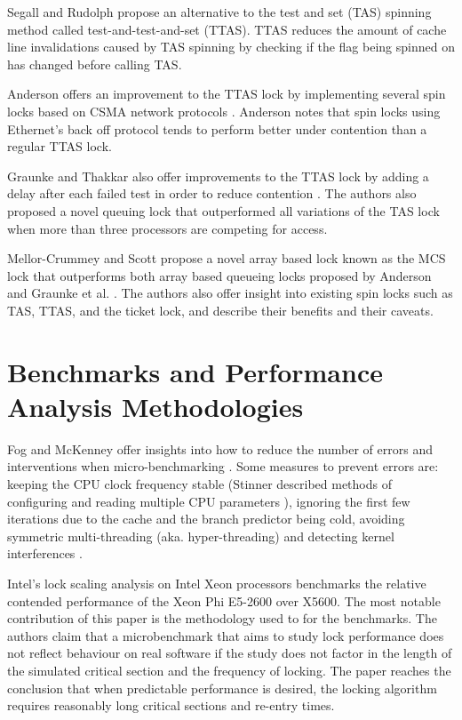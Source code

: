 Segall and Rudolph \cite{rudolph1984dynamic} propose an alternative to the test and set (TAS) spinning method called test-and-test-and-set (TTAS). TTAS reduces the amount of cache line invalidations caused by TAS spinning by checking if the flag being spinned on has changed before calling TAS.

Anderson offers an improvement to the TTAS lock by implementing several spin locks based on CSMA network protocols \cite{anderson1990performance}. Anderson notes that spin locks using Ethernet's back off protocol tends to perform better under contention than a regular TTAS lock.

Graunke and Thakkar also offer improvements to the TTAS lock by adding a delay after each failed test in order to reduce contention \cite{graunke1990synchronization}. The authors also proposed a novel queuing lock that outperformed all variations of the TAS lock when more than three processors are competing for access.

Mellor-Crummey and Scott propose a novel array based lock known as the MCS lock that outperforms both array based queueing locks proposed by Anderson and Graunke et al. \cite{mellor1991algorithms}. The authors also offer insight into existing spin locks such as TAS, TTAS, and the ticket lock, and describe their benefits and their caveats.

\section{Benchmarks and Performance Analysis Methodologies}
Fog and McKenney offer insights into how to reduce the number of errors and interventions when micro-benchmarking \cite{fog1996optimizing,fog2020optimizing, mckenney2017parallel}. Some measures to prevent errors are: keeping the CPU clock frequency stable (Stinner described methods of configuring and reading multiple CPU parameters \cite{stinnerpstate}), ignoring the first few iterations due to the cache and the branch predictor being cold\cite{fog1996optimizing}, avoiding symmetric multi-threading (aka. hyper-threading) \cite{fog2020optimizing} and detecting kernel interferences \cite[Chapter~11.7]{mckenney2017parallel}.

Intel's lock scaling analysis on Intel Xeon processors \cite{intelxeonlockscaling} benchmarks the relative contended performance of the Xeon Phi E5-2600 over X5600. The most notable contribution of this paper is the methodology used to for the benchmarks. The authors claim that a microbenchmark that aims to study lock performance does not reflect behaviour on real software if the study does not factor in the length of the simulated critical section and the frequency of locking. The paper reaches the conclusion that when predictable performance is desired, the locking algorithm requires reasonably long critical sections and re-entry times.

